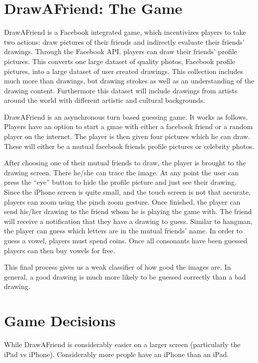 \section{DrawAFriend: The Game}

DrawAFriend is a Facebook integrated game, which incentivizes players to take two actions: draw pictures of their friends and indirectly evaluate their friends’ drawings.  Through the Facebook API, players can draw their friends’ profile pictures. This converts one large dataset of quality photos, Facebook profile pictures, into a large dataset of user created drawings. This collection includes much more than drawings, but drawing strokes as well as an understanding of the drawing content. Furthermore this dataset will include drawings from artists around the world with different artistic and cultural backgrounds. 


DrawAFriend is an asynchronous turn based guessing game. It works as follows. Players have an option to start a gmae with either a facebook friend or a random player on the internet. The player is then given four pictures which he can draw. These will either be a mutual facebook friends profile pictures or celebrity photos.

After choosing one of their mutual friends to draw, the player is brought to the drawing screen. There he/she can trace the image. At any point the user can press the “eye” button to hide the profile picture and just see their drawing.  Since the iPhone screen is quite small, and the touch screen is not that accurate, players can zoom using the pinch zoom gesture. 
Once finished, the player can send his/her drawing to the friend whom he is playing the game with. The friend will receive a notification that they have a drawing to guess. Similar to hangman, the player can guess which letters are in the mutual friends’ name. In order to guess a vowel, players must spend coins. Once all consonants have been guessed players can then buy vowels for free. 

This final process gives us a weak classifier of how good the images are. In general, a good drawing is much more likely to be guessed correctly than a bad drawing.

\section{Game Decisions}
While DrawAFriend is considerably easier on a larger screen (particularly the iPad vs iPhone). Considerably more people have an iPhone than an iPad. 


